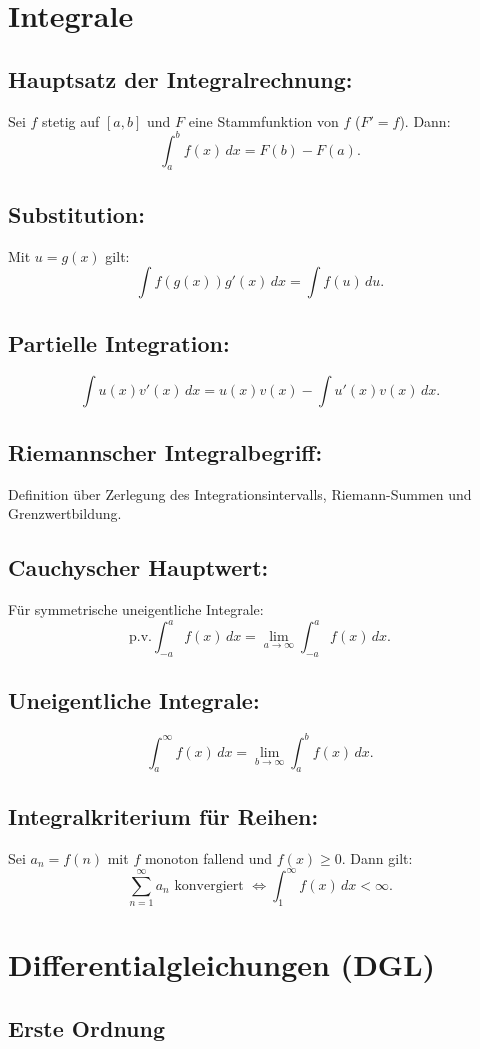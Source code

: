 \documentclass[12pt]{article}
\begin{document}
\section{Integrale}
\subsection*{Hauptsatz der Integralrechnung:}
Sei \( f \) stetig auf \( [a,b] \) und \( F \) eine Stammfunktion von \( f \) (\( F' = f \)). Dann:
\[
\int_a^b f(x)\,dx = F(b)-F(a).
\]
\subsection*{Substitution:}
Mit \( u=g(x) \) gilt:
\[
\int f(g(x))g'(x)\,dx = \int f(u)\,du.
\]
\subsection*{Partielle Integration:}
\[
\int u(x)v'(x)\,dx = u(x)v(x) - \int u'(x)v(x)\,dx.
\]
\subsection*{Riemannscher Integralbegriff:}
Definition über Zerlegung des Integrationsintervalls, Riemann-Summen und Grenzwertbildung.
\subsection*{Cauchyscher Hauptwert:}
Für symmetrische uneigentliche Integrale:
\[
\text{p.v.} \int_{-a}^{a} f(x)\,dx = \lim_{a \to \infty} \int_{-a}^{a} f(x)\,dx.
\]
\subsection*{Uneigentliche Integrale:}
\[
\int_a^\infty f(x)\,dx = \lim_{b \to \infty} \int_a^b f(x)\,dx.
\]
\subsection*{Integralkriterium für Reihen:}
Sei \( a_n = f(n) \) mit \( f \) monoton fallend und \( f(x)\ge0 \). Dann gilt:
\[
\sum_{n=1}^\infty a_n \text{ konvergiert } \Longleftrightarrow \int_1^\infty f(x)\,dx < \infty.
\]

\section{Differentialgleichungen (DGL)}
\subsection*{Erste Ordnung}
\end{document}
